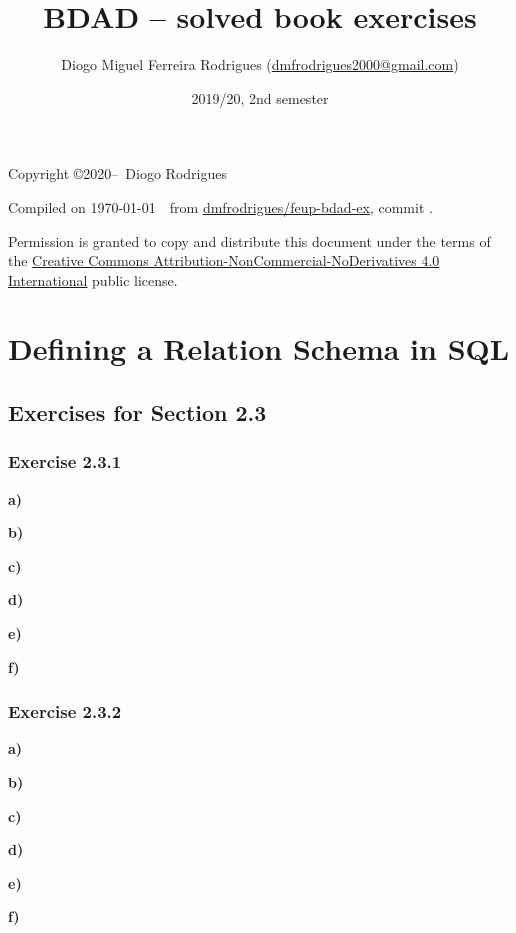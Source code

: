 \documentclass{bdad}
\title{BDAD -- solved book exercises}
\author{Diogo Miguel Ferreira Rodrigues (\href{mailto:dmfrodrigues2000@gmail.com}{dmfrodrigues2000@gmail.com})}
\date{2019/20, 2nd semester}
\begin{document}
\maketitle
\begin{secondpage}
    Copyright \copyright 2020--\the\year\ Diogo Rodrigues\par
    \par
    \immediate{}
    Compiled on \today~\currenttime~from \href{https://github.com/dmfrodrigues/feup-bdad-ex}{dmfrodrigues/feup-bdad-ex}, commit \unskip.\par
    Permission is granted to copy and distribute this document under the terms of the 
    \href{https://creativecommons.org/licenses/by-nc-nd/4.0/}{Creative Commons Attribution-NonCommercial-NoDerivatives 4.0 International}
    public license.
\end{secondpage}
\frontmatter
\tableofcontents
\mainmatter

\setcounter{chapter}{2}
\setcounter{section}{2}
\section{Defining a Relation Schema in SQL}
\subsection{Exercises for Section 2.3}
\subsubsection{Exercise 2.3.1}
\textbf{a)}

\textbf{b)}

\textbf{c)}

\textbf{d)}

\textbf{e)}

\textbf{f)}


\newpage
\subsubsection{Exercise 2.3.2}
\textbf{a)}

\textbf{b)}

\textbf{c)}

\textbf{d)}

\textbf{e)}

\textbf{f)}

\end{document}
